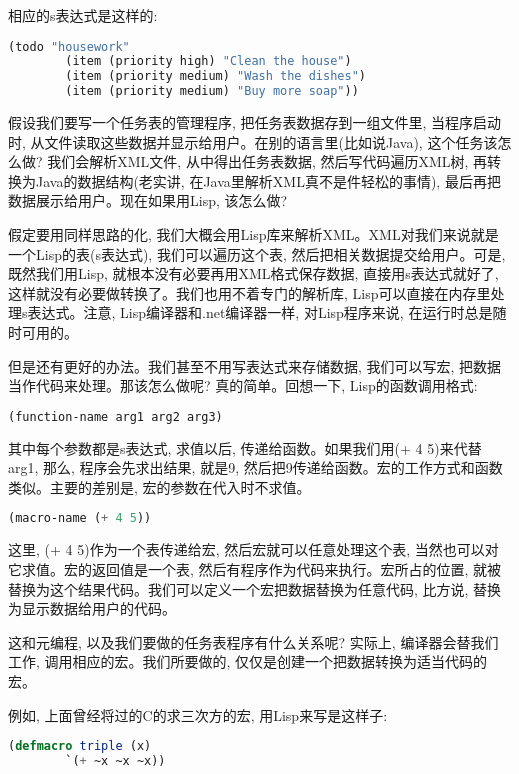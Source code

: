 \documentclass[10pt]{article}
\begin{document}
相应的s表达式是这样的:
\begin{lstlisting}[language=lisp]
    (todo "housework"
        (item (priority high) "Clean the house")
        (item (priority medium) "Wash the dishes")
        (item (priority medium) "Buy more soap"))
\end{lstlisting}

假设我们要写一个任务表的管理程序, 把任务表数据存到一组文件里, 当程序启动时, 从文件读取这些数据并显示给用户。在别的语言里(比如说Java), 这个任务该怎么做? 我们会解析XML文件, 从中得出任务表数据, 然后写代码遍历XML树, 再转换为Java的数据结构(老实讲, 在Java里解析XML真不是件轻松的事情), 最后再把数据展示给用户。现在如果用Lisp, 该怎么做?

假定要用同样思路的化, 我们大概会用Lisp库来解析XML。XML对我们来说就是一个Lisp的表(s表达式), 我们可以遍历这个表, 然后把相关数据提交给用户。可是, 既然我们用Lisp, 就根本没有必要再用XML格式保存数据, 直接用s表达式就好了, 这样就没有必要做转换了。我们也用不着专门的解析库, Lisp可以直接在内存里处理s表达式。注意, Lisp编译器和.net编译器一样, 对Lisp程序来说, 在运行时总是随时可用的。

但是还有更好的办法。我们甚至不用写表达式来存储数据, 我们可以写宏, 把数据当作代码来处理。那该怎么做呢? 真的简单。回想一下, Lisp的函数调用格式:
\begin{lstlisting}[language=lisp]
    (function-name arg1 arg2 arg3)
\end{lstlisting}

其中每个参数都是s表达式, 求值以后, 传递给函数。如果我们用(+ 4 5)来代替arg1, 那么, 程序会先求出结果, 就是9, 然后把9传递给函数。宏的工作方式和函数类似。主要的差别是, 宏的参数在代入时不求值。
\begin{lstlisting}[language=lisp]
  (macro-name (+ 4 5))
\end{lstlisting}

这里, (+ 4 5)作为一个表传递给宏, 然后宏就可以任意处理这个表, 当然也可以对它求值。宏的返回值是一个表, 然后有程序作为代码来执行。宏所占的位置, 就被替换为这个结果代码。我们可以定义一个宏把数据替换为任意代码, 比方说, 替换为显示数据给用户的代码。

这和元编程, 以及我们要做的任务表程序有什么关系呢? 实际上, 编译器会替我们工作, 调用相应的宏。我们所要做的, 仅仅是创建一个把数据转换为适当代码的宏。

例如, 上面曾经将过的C的求三次方的宏, 用Lisp来写是这样子:
\begin{lstlisting}[language=lisp]
  (defmacro triple (x)
        `(+ ~x ~x ~x))
\end{lstlisting}
\end{document}
